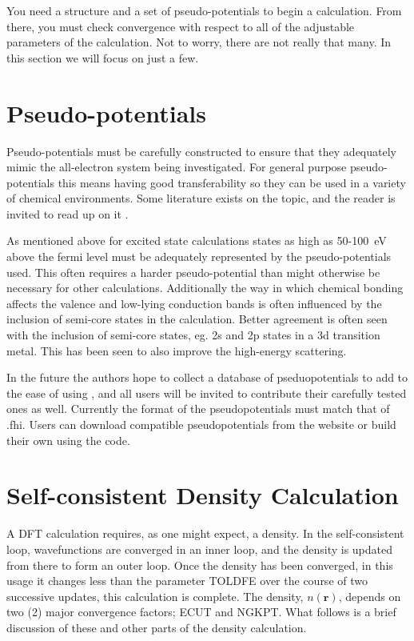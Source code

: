 \documentclass[11pt]{report}
\begin{document}
You need a structure and a set of pseudo-potentials to begin a calculation. From there, you must check convergence with respect to all of the adjustable parameters of the calculation. Not to worry, there are not really that many. In this section we will focus on just a few.

\section{Pseudo-potentials}

Pseudo-potentials must be carefully constructed to ensure that they adequately mimic the all-electron system being investigated. For general purpose pseudo-potentials this means having good transferability so they can be used in a variety of chemical environments. Some literature exists on the topic, and the reader is invited to read up on it\cite{Psp} .

As mentioned above for excited state calculations states as high as 50-100~eV above the fermi level must be adequately represented by the pseudo-potentials used. This often requires a harder pseudo-potential than might otherwise be necessary for 
other calculations. Additionally the way in which chemical bonding affects the valence and low-lying conduction bands is often influenced by the inclusion of semi-core states in the calculation. Better agreement is often seen with the inclusion of semi-core states, eg. 2s and 2p states in a 3d transition metal. This has been seen to also improve the high-energy scattering.\cite{}

In the future the authors hope to collect a database of pseduopotentials to add to the ease of using ,
 and all users will be invited to contribute their carefully tested ones as well. Currently the format of the pseudopotentials must
 match that of  .fhi. Users can download compatible pseudopotentials from the  website \cite{abinit0} or build their own using the  code. 

\section{Self-consistent Density Calculation}
A DFT calculation requires, as one might expect, a density. In the self-consistent loop, wavefunctions are converged in an inner loop, and the density is updated from there to form an outer loop. Once the density has been converged, in this usage it changes less than the parameter TOLDFE over the course of two successive updates, this calculation is complete. The density, $n(\mathbf{r})$, depends on two (2) major convergence factors; ECUT and NGKPT. What follows is a brief discussion of these and other parts of the density calculation.
\end{document}
